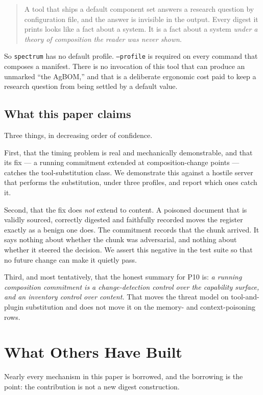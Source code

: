 \documentclass[11pt]{article}
\newcommand{\spectrum}{\texttt{spectrum}}
\begin{document}
\begin{quote}
A tool that ships a default component set answers a research question by
configuration file, and the answer is invisible in the output. Every digest it
prints looks like a fact about a system. It is a fact about a system
\emph{under a theory of composition the reader was never shown}.
\end{quote}

So \spectrum{} has no default profile. \texttt{--profile} is required on every
command that composes a manifest. There is no invocation of this tool that can
produce an unmarked ``the AgBOM,'' and that is a deliberate ergonomic cost
paid to keep a research question from being settled by a default value.

\subsection{What this paper claims}

Three things, in decreasing order of confidence.

First, that the timing problem is real and mechanically demonstrable, and that
its fix --- a running commitment extended at composition-change points ---
catches the tool-substitution class. We demonstrate this against a hostile
server that performs the substitution, under three profiles, and report which
ones catch it.

Second, that the fix does \emph{not} extend to content. A poisoned document
that is validly sourced, correctly digested and faithfully recorded moves the
register exactly as a benign one does. The commitment records that the chunk
arrived. It says nothing about whether the chunk was adversarial, and nothing
about whether it steered the decision. We assert this negative in the test
suite so that no future change can make it quietly pass.

Third, and most tentatively, that the honest summary for P10 is: \emph{a
running composition commitment is a change-detection control over the
capability surface, and an inventory control over content.} That moves the
threat model on tool-and-plugin substitution and does not move it on the
memory- and context-poisoning rows.

\section{What Others Have Built}
\label{sec:related}

Nearly every mechanism in this paper is borrowed, and the borrowing is the
point: the contribution is not a new digest construction.
\end{document}
